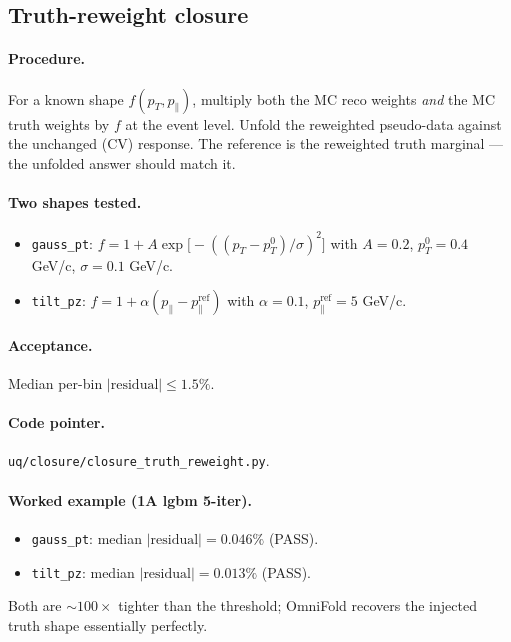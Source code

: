\documentclass[12pt]{article}
\newcommand{\pT}{p_{T}}
\newcommand{\pPar}{p_{\parallel}}
\begin{document}
\subsection{Truth-reweight closure}
\label{sec:closure-tr}

\paragraph{Procedure.}
For a known shape $f(\pT,\pPar)$, multiply both the MC reco weights
\emph{and} the MC truth weights by $f$ at the event level. Unfold the
reweighted pseudo-data against the unchanged (CV) response. The
reference is the reweighted truth marginal --- the unfolded answer
should match it.

\paragraph{Two shapes tested.}
\begin{itemize}[nosep]
  \item \texttt{gauss\_pt}: $f = 1 + A\exp\!\big[-((\pT - p_{T}^{0})/\sigma)^{2}\big]$
        with $A=0.2$, $p_{T}^{0}=0.4$ GeV/c, $\sigma=0.1$ GeV/c.
  \item \texttt{tilt\_pz}: $f = 1 + \alpha(\pPar - \pPar^{\text{ref}})$
        with $\alpha=0.1$, $\pPar^{\text{ref}}=5$ GeV/c.
\end{itemize}

\paragraph{Acceptance.}
Median per-bin $|\text{residual}|\le 1.5\%$.

\paragraph{Code pointer.}
\texttt{uq/closure/closure\_truth\_reweight.py}.

\paragraph{Worked example (1A lgbm 5-iter).}
\begin{itemize}[nosep]
  \item \texttt{gauss\_pt}: median $|\text{residual}|=\boxed{0.046\%}$ (PASS).
  \item \texttt{tilt\_pz}: median $|\text{residual}|=\boxed{0.013\%}$ (PASS).
\end{itemize}
Both are $\sim 100\times$ tighter than the threshold; OmniFold
recovers the injected truth shape essentially perfectly.
\end{document}
